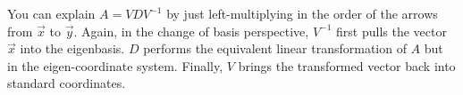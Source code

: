 \begin{enumerate}[resume]
{  You can explain $A = VDV^{-1}$ by just left-multiplying in the order of the arrows from $\vec{x}$ to $\vec{y}$. Again, in the change of basis perspective, $V^{-1}$ first pulls the vector $\vec{x}$ into the eigenbasis. $D$ performs the equivalent linear transformation of $A$ but in the eigen-coordinate system. Finally, $V$ brings the transformed vector back into standard coordinates.
}











\end{enumerate}

